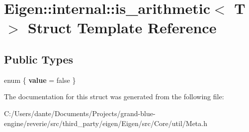 \hypertarget{struct_eigen_1_1internal_1_1is__arithmetic}{}\section{Eigen\+::internal\+::is\+\_\+arithmetic$<$ T $>$ Struct Template Reference}
\label{struct_eigen_1_1internal_1_1is__arithmetic}
\subsection*{Public Types}
\begin{DoxyCompactItemize}
\item 
\mbox{\label{struct_eigen_1_1internal_1_1is__arithmetic_a7c4e43bf55262415da28c00f78339e3a}} 
enum \{ {\bfseries value} = false
 \}
\end{DoxyCompactItemize}


The documentation for this struct was generated from the following file\+:\begin{DoxyCompactItemize}
\item 
C\+:/\+Users/dante/\+Documents/\+Projects/grand-\/blue-\/engine/reverie/src/third\+\_\+party/eigen/\+Eigen/src/\+Core/util/Meta.\+h\end{DoxyCompactItemize}
